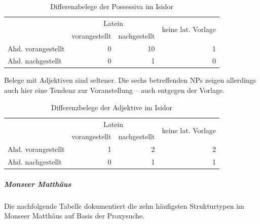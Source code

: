 \begin{table}
\centering
\begin{tabular}{@{}lrrr@{}}
\toprule
                   & \multicolumn{2}{c}{Latein} & \multirow{2}{*}{keine lat. Vorlage}\\
 \cmidrule(lr){2-3}
                   & vorangestellt & nachgestellt & \\ \midrule
Ahd. vorangestellt & 0                  & 10                 & 1                    \\
Ahd. nachgestellt  & 0                  & 1                 & 0                    \\ \bottomrule
\end{tabular}
\caption{Differenzbelege der Possessiva im Isidor}
\label{tab:diff-poss-isidor}
\end{table}

Belege mit Adjektiven sind seltener. Die sechs betreffenden NPs zeigen allerdings auch hier eine Tendenz zur Voranstellung -- auch entgegen der Vorlage. 

\begin{table}
\centering
\begin{tabular}{@{}lrrr@{}}
\toprule
                   & \multicolumn{2}{c}{Latein} & \multirow{2}{*}{keine lat. Vorlage}\\
 \cmidrule(lr){2-3}
                   & vorangestellt & nachgestellt & \\ \midrule
Ahd. vorangestellt & 1                  & 2                 & 2                    \\
Ahd. nachgestellt  & 0                  & 1                 & 1                    \\ \bottomrule
\end{tabular}
\caption{Differenzbelege der Adjektive im Isidor}
\label{tab:diff-adj.-isidor}
\end{table}

\subparagraph*{Monseer Matthäus}

Die nachfolgende Tabelle dokumentiert die zehn häufigsten Strukturtypen im Monseer Matthäus auf Basis der Proxysuche. 

